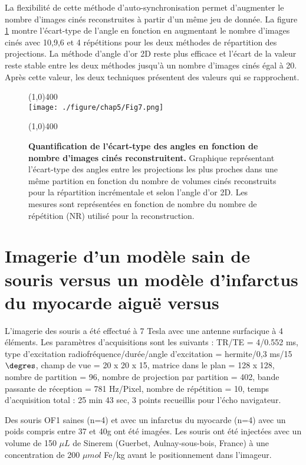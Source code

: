 La flexibilité de cette méthode d'auto-synchronisation permet d'augmenter le nombre d'images cinés reconstruites à partir d'un même jeu de donnée. La figure \ref{fig:GoldVSIncNCine} montre l'écart-type de l'angle en fonction en augmentant le nombre d'images cinés avec 10,9,6 et 4 répétitions pour les deux méthodes de répartition des projections. La méthode d'angle d'or 2D reste plus efficace et l'écart de la valeur reste stable entre les deux méthodes jusqu'à un nombre d'images cinés égal à 20. Après cette valeur, les deux techniques présentent des valeurs qui se rapprochent.

\begin{figure}[H]
\centering
\line(1,0){400} \\
\texttt{[image: ./figure/chap5/Fig7.png]}
\caption[Quantification de l'écart-type des angles en fonction de nombre d'images cinés reconstruitent.]{\label{fig:GoldVSIncNCine} \textbf{Quantification de l'écart-type des angles en fonction de nombre d'images cinés reconstruitent.} Graphique représentant  l'écart-type des angles entre les projections les plus proches dans une même partition en fonction du nombre de volumes cinés reconstruits pour la répartition incrémentale et selon l'angle d'or 2D. Les mesures sont représentées en fonction de nombre du nombre de répétition (NR) utilisé pour la reconstruction.}
\line(1,0){400} \\ 
\end{figure}

\section{Imagerie d'un modèle sain de souris versus un modèle d'infarctus du myocarde aiguë versus}

L'imagerie des souris a été effectué à 7 Tesla avec une antenne surfacique à 4 éléments. Les paramètres d'acquisitions sont les suivants :
TR/TE = 4/0.552 ms, type d'excitation radiofréquence/durée/angle d'excitation = hermite/0,3 ms/15$\degres$, champ de vue = 20 x 20 x 15, matrice dans le plan = 128 x 128, nombre de partition = 96, nombre de projection par partition = 402, bande passante de réception = 781 Hz/Pixel, nombre de répétition = 10, temps d'acquisition total : 25 min 43 sec, 3 points recueillis pour l'écho navigateur.

Des souris OF1 saines (n=4) et avec un infarctus du myocarde (n=4) avec un poids compris entre 37 et 40g ont été imagées. Les souris ont été injectées avec un volume de 150 $\mu L$ de Sinerem (Guerbet, Aulnay-sous-bois, France) à une concentration de 200 $\mu mol$ Fe/kg avant le positionnement dans l'imageur.

